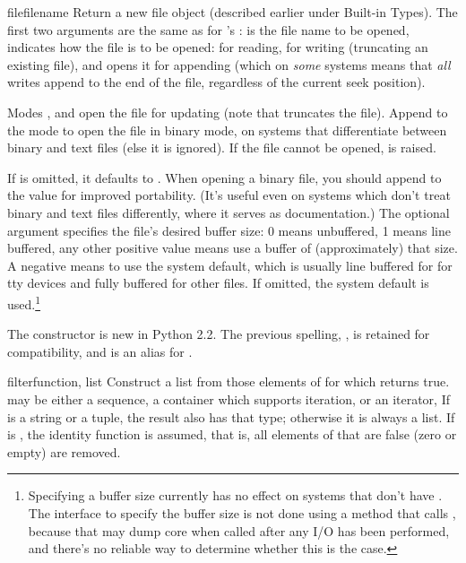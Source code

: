 \begin{funcdesc}{file}{filename}
  Return a new file object (described earlier under Built-in Types).
  The first two arguments are the same as for 's
  :  is the file name to be opened,
   indicates how the file is to be opened:  for
  reading,  for writing (truncating an existing file), and
   opens it for appending (which on \emph{some} \UNIX{}
  systems means that \emph{all} writes append to the end of the file,
  regardless of the current seek position).

  Modes ,  and  open the file for
  updating (note that  truncates the file).  Append
   to the mode to open the file in binary mode, on systems
  that differentiate between binary and text files (else it is
  ignored).  If the file cannot be opened,  is
  raised.

  If  is omitted, it defaults to .  When opening a
  binary file, you should append  to the  value
  for improved portability.  (It's useful even on systems which don't
  treat binary and text files differently, where it serves as
  documentation.)
  The optional  argument specifies the
  file's desired buffer size: 0 means unbuffered, 1 means line
  buffered, any other positive value means use a buffer of
  (approximately) that size.  A negative  means to use
  the system default, which is usually line buffered for for tty
  devices and fully buffered for other files.  If omitted, the system
  default is used.\footnote{
    Specifying a buffer size currently has no effect on systems that
    don't have .  The interface to specify the
    buffer size is not done using a method that calls
    , because that may dump core when called
    after any I/O has been performed, and there's no reliable way to
    determine whether this is the case.}

  The  constructor is new in Python 2.2.  The previous
  spelling, , is retained for compatibility, and is an
  alias for .
\end{funcdesc}

\begin{funcdesc}{filter}{function, list}
  Construct a list from those elements of  for which
   returns true.   may be either a sequence, a
  container which supports iteration, or an iterator,  If 
  is a string or a tuple, the result also has that type; otherwise it
  is always a list.  If  is , the identity
  function is assumed, that is, all elements of  that are false
  (zero or empty) are removed.
\end{funcdesc}

